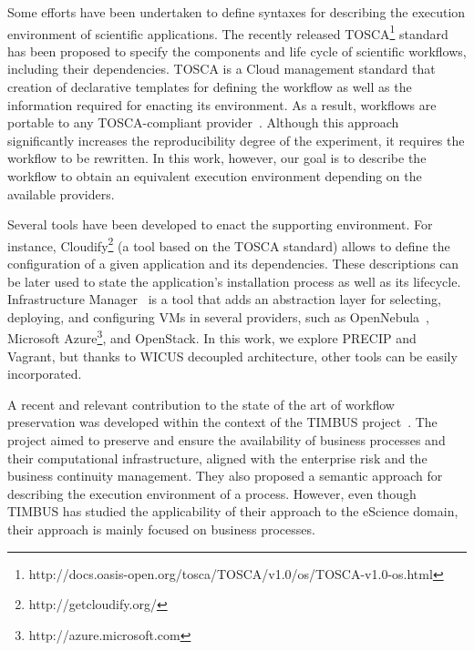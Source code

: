 Some efforts have been undertaken to define syntaxes for describing the 
execution environment of scientific applications. The recently released 
TOSCA\footnote{http://docs.oasis-open.org/tosca/TOSCA/v1.0/os/TOSCA-v1.0-os.html} 
standard has been proposed to specify the components and life cycle of 
scientific workflows, including their dependencies. TOSCA is a Cloud 
management standard that creation of declarative templates 
for defining the workflow as well as the information required for enacting 
its environment. As a result, workflows are portable to any TOSCA-compliant 
provider~\cite{TOSCA}. Although this approach significantly increases the 
reproducibility degree of the experiment, it requires the workflow to be
rewritten. In this work, however, our goal is to describe the workflow to 
obtain an equivalent execution environment depending on the available 
providers.



Several tools have been developed to enact the supporting environment.
For instance, Cloudify\footnote{http://getcloudify.org/} (a tool based on the
TOSCA standard) allows to define the configuration of a given application 
and its dependencies. These descriptions can be later used to state the 
application's installation process as well as its lifecycle. Infrastructure 
Manager~\cite{IM2015} is a tool that adds an abstraction layer for selecting, 
deploying, and configuring VMs in several providers, such as OpenNebula~\cite{opennebula}, 
Microsoft Azure\footnote{http://azure.microsoft.com}, and OpenStack. In
this work, we explore PRECIP and Vagrant, but thanks to WICUS decoupled
architecture, other tools can be easily incorporated.



A recent and relevant contribution to the state of the art of workflow preservation was developed within the context of the TIMBUS project~\cite{Mayer2014Ontologies}. The project  aimed to preserve and ensure the availability of business processes and their computational infrastructure, aligned with the enterprise risk and the business continuity management. They also proposed a semantic approach for describing the execution environment of a process.  However, even though TIMBUS has studied the applicability of their approach to the eScience domain, their approach is mainly focused on business processes.

